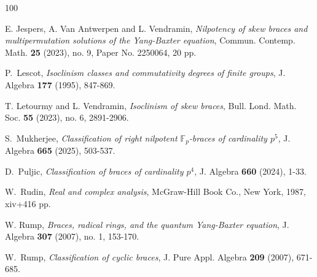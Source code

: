 \documentclass[oneside]{amsart}
\numberwithin{equation}{section}
\theoremstyle{plain}
\theoremstyle{definition}
\begin{document}
\begin{thebibliography}{100}

E. Jespers,  A.  Van Antwerpen and L.  Vendramin,  \emph{Nilpotency of skew braces and multipermutation solutions of the Yang-Baxter equation}, Commun. Contemp. Math. {\bf 25} (2023), no. 9, Paper No. 2250064, 20 pp.


P.~Lescot, \emph{Isoclinism classes and commutativity degrees of finite groups}, J. Algebra {\bf 177} (1995), 847-869.

T. Letourmy and L. Vendramin, \emph{Isoclinism of skew braces}, Bull. Lond. Math. Soc. {\bf 55} (2023), no. 6, 2891-2906.

S.~Mukherjee,  \emph{Classification of right nilpotent $\mathbb{F}_p$-braces of cardinality $p^5$},  J. Algebra {\bf 665} (2025), 503-537.

 


D.~Puljic, \emph{Classification of braces of cardinality $p^4$}, J. Algebra {\bf 660} (2024), 1-33. 

W.~Rudin,  \emph{Real and complex analysis},  McGraw-Hill Book Co., New York, 1987, xiv+416 pp.

W. Rump, \emph{Braces, radical rings, and the quantum Yang-Baxter equation},  J. Algebra {\bf 307} (2007), no. 1, 153-170.

W.~Rump, \emph{Classification of cyclic braces}, J. Pure Appl. Algebra {\bf 209} (2007), 671-685.



\end{thebibliography}
\end{document}
